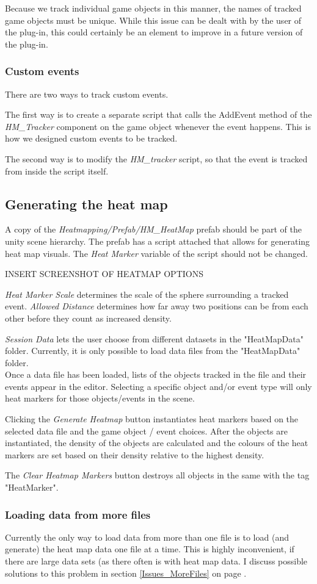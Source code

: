 Because we track individual game objects in this manner, the names of tracked game objects must be unique. While this issue can be dealt with by the user of the plug-in, this could certainly be an element to improve in a future version of the plug-in.

\subsubsection{Custom events}
There are two ways to track custom events. 

The first way is to create a separate script that calls the AddEvent method of the \textit{HM\_Tracker} component on the game object whenever the event happens. This is how we designed custom events to be tracked.

The second way is to modify the \textit{HM\_tracker} script, so that the event is tracked from inside the script itself.

\subsection{Generating the heat map}
\label{HowToUse_Generating}
A copy of the \textit{Heatmapping/Prefab/HM\_HeatMap} prefab should be part of the unity scene hierarchy. The prefab has a script attached that allows for generating heat map visuals. The \textit{Heat Marker} variable of the script should not be changed. 

INSERT SCREENSHOT OF HEATMAP OPTIONS

\textit{Heat Marker Scale} determines the scale of the sphere surrounding a tracked event. \textit{Allowed Distance} determines how far away two positions can be from each other before they count as increased density.

\textit{Session Data} lets the user choose from different datasets in the "HeatMapData" folder. Currently, it is only possible to load data files from the "HeatMapData" folder.
\\Once a data file has been loaded, lists of the objects tracked in the file and their events appear in the editor. Selecting a specific object and/or event type will only heat markers for those objects/events in the scene.

Clicking the \textit{Generate Heatmap} button instantiates heat markers based on the selected data file and the game object / event choices. After the objects are instantiated, the density of the objects are calculated and the colours of the heat markers are set based on their density relative to the highest density.

The \textit{Clear Heatmap Markers} button destroys all objects in the same with the tag "HeatMarker". 

\subsubsection{Loading data from more files}
Currently the only way to load data from more than one file is to load (and generate) the heat map data one file at a time. This is highly inconvenient, if there are large data sets (as there often is with heat map data. I discuss possible solutions to this problem in section \ref{Issues_MoreFiles} on page \pageref{Issues_MoreFiles}.
